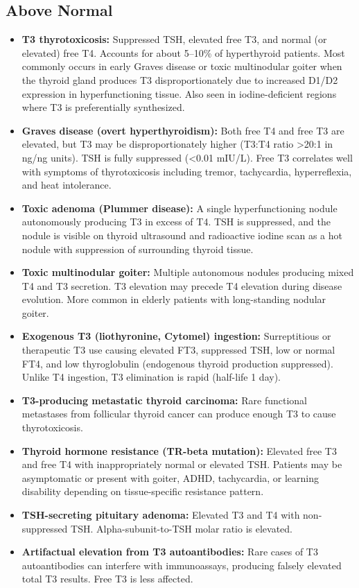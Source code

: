 \subsection*{Above Normal}
\begin{itemize}
  \item \textbf{T3 thyrotoxicosis:} Suppressed TSH, elevated free T3, and normal (or elevated) free T4. Accounts for about 5--10\% of hyperthyroid patients. Most commonly occurs in early Graves disease or toxic multinodular goiter when the thyroid gland produces T3 disproportionately due to increased D1/D2 expression in hyperfunctioning tissue. Also seen in iodine-deficient regions where T3 is preferentially synthesized.
  \item \textbf{Graves disease (overt hyperthyroidism):} Both free T4 and free T3 are elevated, but T3 may be disproportionately higher (T3:T4 ratio >20:1 in ng/ng units). TSH is fully suppressed (<0.01 mIU/L). Free T3 correlates well with symptoms of thyrotoxicosis including tremor, tachycardia, hyperreflexia, and heat intolerance.
  \item \textbf{Toxic adenoma (Plummer disease):} A single hyperfunctioning nodule autonomously producing T3 in excess of T4. TSH is suppressed, and the nodule is visible on thyroid ultrasound and radioactive iodine scan as a hot nodule with suppression of surrounding thyroid tissue.
  \item \textbf{Toxic multinodular goiter:} Multiple autonomous nodules producing mixed T4 and T3 secretion. T3 elevation may precede T4 elevation during disease evolution. More common in elderly patients with long-standing nodular goiter.
  \item \textbf{Exogenous T3 (liothyronine, Cytomel) ingestion:} Surreptitious or therapeutic T3 use causing elevated FT3, suppressed TSH, low or normal FT4, and low thyroglobulin (endogenous thyroid production suppressed). Unlike T4 ingestion, T3 elimination is rapid (half-life 1 day).
  \item \textbf{T3-producing metastatic thyroid carcinoma:} Rare functional metastases from follicular thyroid cancer can produce enough T3 to cause thyrotoxicosis.
  \item \textbf{Thyroid hormone resistance (TR-beta mutation):} Elevated free T3 and free T4 with inappropriately normal or elevated TSH. Patients may be asymptomatic or present with goiter, ADHD, tachycardia, or learning disability depending on tissue-specific resistance pattern.
  \item \textbf{TSH-secreting pituitary adenoma:} Elevated T3 and T4 with non-suppressed TSH. Alpha-subunit-to-TSH molar ratio is elevated.
  \item \textbf{Artifactual elevation from T3 autoantibodies:} Rare cases of T3 autoantibodies can interfere with immunoassays, producing falsely elevated total T3 results. Free T3 is less affected.
\end{itemize}

